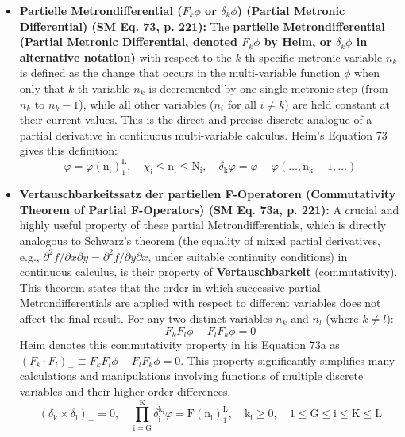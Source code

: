 \documentclass[12pt]{article}
\begin{document}
\begin{itemize}
    \item \textbf{Partielle Metrondifferential (\( F_k\phi \) or \( \delta_k\phi \)) (Partial Metronic Differential) (SM Eq. 73, p. 221):}
    The \textbf{partielle Metrondifferential (Partial Metronic Differential, denoted \( F_k\phi \) by Heim, or \( \delta_k\phi \) in alternative notation)} with respect to the \( k \)-th specific metronic variable \( n_k \) is defined as the change that occurs in the multi-variable function \( \phi \) when only that \( k \)-th variable \( n_k \) is decremented by one single metronic step (from \( n_k \) to \( n_k-1 \)), while all other variables (\( n_i \) for all \( i \neq k \)) are held constant at their current values. This is the direct and precise discrete analogue of a partial derivative in continuous multi-variable calculus. Heim's Equation 73 gives this definition:
    \begin{equation}
    \varphi = \varphi(\mathrm{n_i})_1^\mathrm{L}, \quad \chi_\mathrm{i} \le \mathrm{n_i} \le \mathrm{N_i}, \quad \delta_{\mathrm{k}}\varphi = \varphi - \varphi(\dots, \mathrm{n_k}-1, \dots) \tag{73}
    \label{eq:original_partial_metrondifferential}
    \end{equation}

    \item \textbf{Vertauschbarkeitssatz der partiellen F-Operatoren (Commutativity Theorem of Partial F-Operators) (SM Eq. 73a, p. 221):}
    A crucial and highly useful property of these partial Metrondifferentials, which is directly analogous to Schwarz's theorem (the equality of mixed partial derivatives, e.g., \( \partial^2f/\partial x \partial y = \partial^2f/\partial y \partial x \), under suitable continuity conditions) in continuous calculus, is their property of \textbf{Vertauschbarkeit} (commutativity). This theorem states that the order in which successive partial Metrondifferentials are applied with respect to different variables does not affect the final result. For any two distinct variables \( n_k \) and \( n_l \) (where \( k \neq l \)):
    \[ F_k F_l \phi - F_l F_k \phi = 0 \]
    Heim denotes this commutativity property in his Equation 73a as \( (F_k \cdot F_l)_- \equiv F_k F_l \phi - F_l F_k \phi = 0 \). This property significantly simplifies many calculations and manipulations involving functions of multiple discrete variables and their higher-order differences.
    \begin{equation}
    (\delta_{\mathrm{k}} \times \delta_{\mathrm{l}})_- = 0, \quad \prod_{\mathrm{i=G}}^{\mathrm{K}} \delta_{\mathrm{i}}^{\mathrm{k_i}} \varphi = \mathrm{F}(\mathrm{n_i})_1^\mathrm{L}, \quad \mathrm{k_i} \ge 0, \quad 1 \le \mathrm{G} \le \mathrm{i} \le \mathrm{K} \le \mathrm{L} \tag{73a}
    \end{equation}


\end{itemize}
\end{document}
